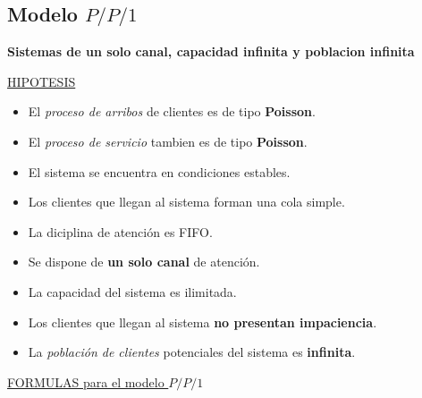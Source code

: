\documentclass{article}
\begin{document}
\subsection{Modelo \(P/P/1\)}
\textbf{Sistemas de un solo canal, capacidad infinita y poblacion infinita}

\noindent
\underline{HIPOTESIS}
\begin{itemize}
    \item El \textit{proceso de arribos} de clientes es de tipo \textbf{Poisson}.
    \item El \textit{proceso de servicio} tambien es de tipo \textbf{Poisson}.
    \item El sistema se encuentra en condiciones estables.
    \item Los clientes que llegan al sistema forman una cola simple.
    \item La diciplina de atención es FIFO.
    \item Se dispone de \textbf{un solo canal} de atención.
    \item La capacidad del sistema es ilimitada.
    \item Los clientes que llegan al sistema \textbf{no presentan impaciencia}.
    \item La \textit{población de clientes} potenciales del sistema es \textbf{infinita}.
\end{itemize}

\noindent
\underline{FORMULAS para el modelo \(P/P/1\)}
\end{document}
